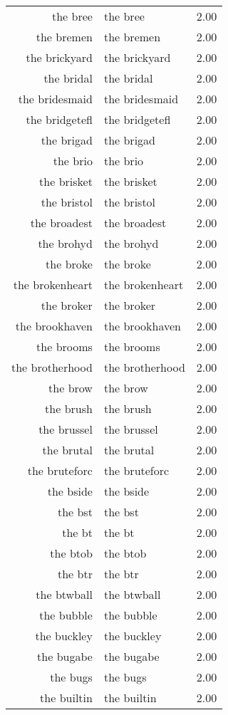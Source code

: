 \begin{table}[ht]
\begin{tabular}{rlr}
  the bree & the bree & 2.00 \\ 
  the bremen & the bremen & 2.00 \\ 
  the brickyard & the brickyard & 2.00 \\ 
  the bridal & the bridal & 2.00 \\ 
  the bridesmaid & the bridesmaid & 2.00 \\ 
  the bridgetefl & the bridgetefl & 2.00 \\ 
  the brigad & the brigad & 2.00 \\ 
  the brio & the brio & 2.00 \\ 
  the brisket & the brisket & 2.00 \\ 
  the bristol & the bristol & 2.00 \\ 
  the broadest & the broadest & 2.00 \\ 
  the brohyd & the brohyd & 2.00 \\ 
  the broke & the broke & 2.00 \\ 
  the brokenheart & the brokenheart & 2.00 \\ 
  the broker & the broker & 2.00 \\ 
  the brookhaven & the brookhaven & 2.00 \\ 
  the brooms & the brooms & 2.00 \\ 
  the brotherhood & the brotherhood & 2.00 \\ 
  the brow & the brow & 2.00 \\ 
  the brush & the brush & 2.00 \\ 
  the brussel & the brussel & 2.00 \\ 
  the brutal & the brutal & 2.00 \\ 
  the bruteforc & the bruteforc & 2.00 \\ 
  the bside & the bside & 2.00 \\ 
  the bst & the bst & 2.00 \\ 
  the bt & the bt & 2.00 \\ 
  the btob & the btob & 2.00 \\ 
  the btr & the btr & 2.00 \\ 
  the btwball & the btwball & 2.00 \\ 
  the bubble & the bubble & 2.00 \\ 
  the buckley & the buckley & 2.00 \\ 
  the bugabe & the bugabe & 2.00 \\ 
  the bugs & the bugs & 2.00 \\ 
  the builtin & the builtin & 2.00 \\ 

\end{tabular}
\end{table}
